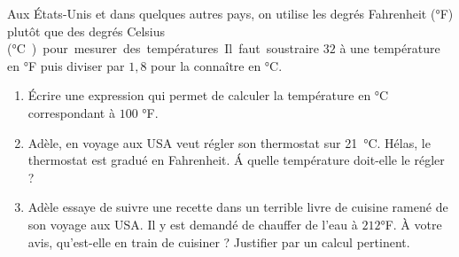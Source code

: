 
\begin{exercice}\label{exosmath-0821}

Aux États-Unis et dans quelques autres pays, on utilise les degrés Fahrenheit (°F) plutôt que des degrés Celsius (\si\degreeCelsius) pour mesurer des températures. Il faut soustraire $32$ à une température en °F puis diviser par $1,8$ pour la connaître en °C.  

\begin{enumerate}
    \item
        Écrire une expression qui permet de calculer la température en °C correspondant à \( 100 \) °F.
    \item
        Adèle, en voyage aux USA veut régler son thermostat sur \SI{21}{\degreeCelsius}. Hélas, le thermostat est gradué en Fahrenheit. Á quelle température doit-elle le régler ?
    \item
        Adèle essaye de suivre une recette dans un terrible livre de cuisine ramené de son voyage aux USA. Il y est demandé de chauffer de l'eau à \( 212\)°F. À votre avis, qu'est-elle en train de cuisiner ? Justifier par un calcul pertinent.
\end{enumerate}

\end{exercice}
